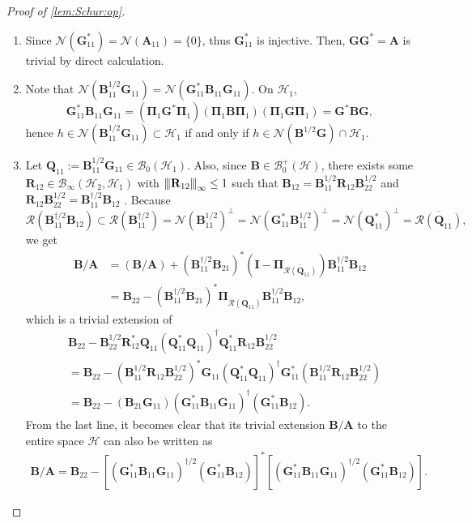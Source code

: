 \documentclass[noinfoline]{imsart}\setcounter{tocdepth}{2}
\newcommand{\m}[1]{\mathbf{#1}} %
\renewcommand{\c}[1]{\mathcal{#1}} %
\newcommand{\vertii}[1]{{\vert\kern-0.25ex\vert\kern-0.25ex\vert #1 
    \vert\kern-0.25ex\vert\kern-0.25ex\vert}} %
\theoremstyle{plain}
\begin{document}
\begin{proof}[Proof of \cref{lem:Schur:op}] \quad
\begin{enumerate}[leftmargin=*]
\item Since $\c{N}(\m{G}_{11}^{*}) = \c{N}(\m{A}_{11}) = \{0\}$, thus $\m{G}_{11}^{*}$ is injective. Then, $\m{G} \m{G}^{*} = \m{A}$ is trivial by direct calculation.
\item Note that $\c{N}(\m{B}_{11}^{1/2} \m{G}_{11}) = \c{N}(\m{G}_{11}^{*} \m{B}_{11} \m{G}_{11})$. On $\c{H}_{1}$,
\begin{equation*}
    \m{G}_{11}^{*} \m{B}_{11} \m{G}_{11} = (\m{\Pi}_{1} \m{G}^{*} \m{\Pi}_{1}) (\m{\Pi}_{1} \m{B} \m{\Pi}_{1}) (\m{\Pi}_{1} \m{G} \m{\Pi}_{1}) = \m{G}^{*} \m{B} \m{G},
\end{equation*}
hence $h \in \c{N}(\m{B}_{11}^{1/2} \m{G}_{11}) \subset \c{H}_{1}$ if and only if $h \in \c{N}(\m{B}^{1/2} \m{G}) \cap \c{H}_{1}$.

\item Let $\m{Q}_{11} := \m{B}_{11}^{1/2} \m{G}_{11} \in \c{B}_{0}(\c{H}_{1})$. Also, since $\m{B} \in \c{B}_{0}^{+}(\c{H})$, there exists some $\m{R}_{12} \in \c{B}_{\infty}(\c{H}_{2}, \c{H}_{1})$ with $\vertii{\m{R}_{12}}_{\infty} \le 1$ such that $\m{B}_{12} = \m{B}_{11}^{1/2} \m{R}_{12} \m{B}_{22}^{1/2}$ and $\m{R}_{12} \m{B}_{22}^{1/2} = \m{B}_{11}^{\dagger/2} \m{B}_{12}$ \cite{baker1970mutual}. Because
\begin{equation*}
    \c{R}(\m{B}_{11}^{\dagger/2} \m{B}_{12}) \subset \c{R}(\m{B}_{11}^{\dagger/2}) = \c{N}(\m{B}_{11}^{1/2})^{\perp} = \c{N}(\m{G}_{11}^{*} \m{B}_{11}^{1/2})^{\perp} = \c{N}(\m{Q}_{11}^{*})^{\perp} = \overline{\c{R}(\m{Q}_{11})},
\end{equation*}
we get
\begin{align*}
    \m{B}/\m{A} &= (\m{B}/\m{A}) + (\m{B}_{11}^{\dagger/2} \m{B}_{21})^{*} (\m{I} - \m{\Pi}_{\overline{\c{R}(\m{Q}_{11})}}) \m{B}_{11}^{\dagger/2} \m{B}_{12} \\
    &= \m{B}_{22} - (\m{B}_{11}^{\dagger/2} \m{B}_{21})^{*} \m{\Pi}_{\overline{\c{R}(\m{Q}_{11})}} \m{B}_{11}^{\dagger/2} \m{B}_{12},
\end{align*}
which is a trivial extension of
\begin{align*}
    &\m{B}_{22}- \m{B}_{22}^{1/2} \m{R}_{12}^{*} \m{Q}_{11} (\m{Q}_{11}^{*} \m{Q}_{11})^{\dagger} \m{Q}_{11}^{*} \m{R}_{12} \m{B}_{22}^{1/2} \\
    &= \m{B}_{22}- (\m{B}_{11}^{1/2} \m{R}_{12} \m{B}_{22}^{1/2})^{*} \m{G}_{11} (\m{Q}_{11}^{*} \m{Q}_{11})^{\dagger} \m{G}_{11}^{*} (\m{B}_{11}^{1/2} \m{R}_{12} \m{B}_{22}^{1/2}) \\
    &= \m{B}_{22} - (\m{B}_{21} \m{G}_{11}) (\m{G}_{11}^{*} \m{B}_{11} \m{G}_{11})^{\dagger} (\m{G}_{11}^{*} \m{B}_{12}).
\end{align*}
From the last line, it becomes clear that its trivial extension $\m{B}/\m{A}$ to the entire space $\c{H}$ can also be written as
\begin{align*}
    \m{B}/\m{A} = \m{B}_{22} - [(\m{G}_{11}^{*} \m{B}_{11} \m{G}_{11})^{\dagger/2} (\m{G}_{11}^{*} \m{B}_{12})]^{*} [(\m{G}_{11}^{*} \m{B}_{11} \m{G}_{11})^{\dagger/2} (\m{G}_{11}^{*} \m{B}_{12})].
\end{align*}


\end{enumerate}
\end{proof}
\end{document}
